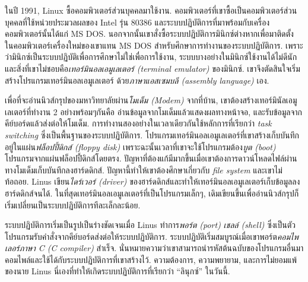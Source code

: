 \begin{thwbr}
{ในปี 1991, Linux ซื้อคอมพิวเตอร์ส่วนบุคคลมาใช้งาน. คอมพิวเตอร์ที่เขาซื้อเป็นคอมพิวเตอร์ส่วนบุคคลที่ใช้หน่วยประมวลผลของ Intel รุ่น 80386 และระบบปฏิบัติการที่มาพร้อมกับเครื่องคอมพิวเตอร์นั้นได้แก่ MS DOS. นอกจากนั้นเขาสั่งซื้อระบบปฏิบัติการมินิกซ์ต่างหากเพื่อมาติดตั้ง%
ในคอมพิวเตอร์เครื่องใหม่ของเขาแทน MS DOS สำหรับศึกษาการทำงานของระบบปฏิบัติการ. เพราะว่ามินิกซ์เป็นระบบปฏิบัติเพื่อการศึกษาไม่ใช่เพื่อการใช้งาน, ระบบบางอย่างในมินิกซ์ใช้งานได้ไม่ดีนักและสิ่งที่เขาไม่ชอบคือ{\em เทอร์มินอลเอมูเลเตอร์ (terminal emulator) }ของมินิกซ์. เขาจึงตัดสินใจเริ่มสร้างโปรแกรมเทอร์มินอลเอมูเลเตอร์%
%
ด้วย{\em ภาษาแอสเซมบลี (assembly language)} เอง.

เพื่อที่จะอ่านนิวส์กรุปของมหาวิทยาลัยผ่าน{\em โมเด็ม (Modem)} จากที่บ้าน, เขาต้องสร้างเทอร์มินัลเอมูเลเตอร์ที่ทำงาน 2 อย่างพร้อมๆกันคือ อ่านข้อมูลจากโมเด็มแล้วแสดงผลทางหน้าจอ,
และรับข้อมูลจากคีย์บอร์ดแล้วส่งต่อให้โมเด็ม.
การทำงานสองอย่างในเวลาเดียวกันใช้หลักการที่เรียกว่า {\em task switching} ซึ่งเป็นพื้นฐานของระบบปฏิบัติการ.
โปรแกรมเทอร์มินอลเอมูเลเตอร์ที่เขาสร้างเก็บบันทึกอยู่ในแผ่น{\em ฟล็อปปี้ดิกส์ (floppy disk)}
เพราะฉะนั้นเวลาที่เขาจะใช้โปรแกรมต้อง{\em บูต (boot)} โปรแกรมจากแผ่นฟล็อปปี้ดิกส์โดยตรง. ปัญหาที่ต้องแก้มีมากขึ้นเมื่อเขาต้องการดาวน์โหลดไฟล์ผ่านทางโมเด็มเก็บบันทึกลงฮาร์ดดิกส์. ปัญหานี้ทำให้เขาต้องศึกษาเกี่ยวกับ {\em file system} และเขาไม่ท้อถอย. Linus
เขียน{\em ไดร์เวอร์ (driver)} ของฮาร์ดดิกส์และทำให้เทอร์มินอลเอมูเลเตอร์เก็บข้อมูลลงฮาร์ดดิกส์จนได้. ในที่สุดเทอร์มินอลเอมูเลเตอร์ที่เป็นโปรแกรมเล็กๆ, เดิมเขียนขึ้นเพื่ออ่านนิวส์กรุปก็เริ่มเปลี่ยนเป็นระบบปฏิบัติการทีละเล็กละน้อย. 

ระบบปฏิบัติการเริ่มเป็นรูปเป็นร่างชัดเจนเมื่อ Linus ทำการ{\em พอร์ต (port)} %
{\em เชลล์ (shell)} 
ซึ่งเป็นตัวโปรแกรมรับคำสั่งจากคีย์บอร์ดส่งต่อให้ระบบปฏิบัติการ. ระบบปฏิบัติเริ่มสมบูรณ์เมื่อเขาพอร์ต{\em คอมไพเลอร์ภาษา  C (C compiler)} สำเร็จ.
นั่นหมายความว่าเขาสามารถนำรหัสต้นฉบับของโปรแกรมอื่นมาคอมไพล์และใช้ได้กับระบบปฏิบัติการที่เขาสร้างไว้. ความต้องการ, ความพยายาม, และการไม่ยอมแพ้ของนาย Linus นี่เองที่ทำให้เกิดระบบปฏิบัติการที่เรียกว่า ``ลินุกซ์'' ในวันนี้.

}
\end{thwbr}
